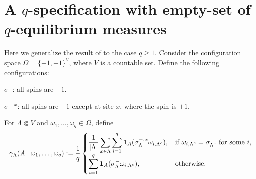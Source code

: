 \documentclass[11pt,reqno]{amsart}
\numberwithin{equation}{section} \setcounter{tocdepth}{1}
\begin{document}
  
\section{A $q$-specification with empty-set of $q$-equilibrium measures} Here we generalize the result of \cite[Exersize 6.15]{FV} to the case $q\geq 1$.
Consider the configuration space $\Omega = \{-1, +1\}^V$, 
where $V$ is a countable set. Define the following configurations:

$\sigma^-$: all spins are $-1$.

$\sigma^{-,x}$: all spins are $-1$ except at site $x$, where the spin is $+1$.

For $\Lambda \Subset V$ and $\omega_1, \dots, \omega_q \in \Omega$, define
\begin{equation}\label{qs0}   
\gamma_\Lambda(A \mid \omega_1, \dots, \omega_q) :={1\over q}
\begin{cases}
\displaystyle \frac{1}{|\Lambda|} \sum_{x \in \Lambda} \sum_{i=1}^q \mathbf{1}_A(\sigma_\Lambda^{-,x} \omega_{i,\Lambda^c}), & \text{if } \omega_{i,\Lambda^c} = \sigma^-_{\Lambda^c} \text{ for some } i, \\
\displaystyle \sum_{i=1}^q \mathbf{1}_A(\sigma^-_\Lambda \omega_{i,\Lambda^c}), & \text{otherwise}.
\end{cases}
 \end{equation}
\end{document}
